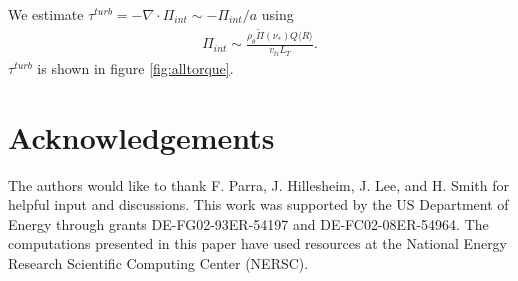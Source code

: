 \documentclass{article}
\numberwithin{figure}{section}
\numberwithin{equation}{section}
\begin{document}
We estimate $\tau^{turb} = - \nabla \cdot \Pi_{int} \sim -\Pi_{int}/a$ using 
\begin{gather}
\Pi_{int} \sim \frac{\rho_{\theta} \widetilde{\Pi}(\nu_*) Q \langle R \rangle}{v_{ti} L_T}.
\end{gather}
$\tau^{turb}$ is shown in figure \ref{fig:alltorque}.

\FloatBarrier

\section*{Acknowledgements}
The authors would like to thank F. Parra, J. Hillesheim, J. Lee, and H. Smith for helpful input and discussions. This work was supported by the US Department of Energy through grants DE-FG02-93ER-54197 and DE-FC02-08ER-54964. The computations presented in this paper have used resources at the National Energy Research Scientific Computing Center (NERSC). 


\small

\end{document}
